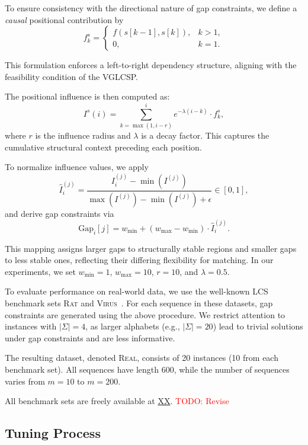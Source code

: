 \documentclass[runningheads]{llncs}
\begin{document}
To ensure consistency with the directional nature of gap constraints, we define a \emph{causal} positional contribution by
\[
f^s_k =
\begin{cases}
	f(s[k-1], s[k]), & k > 1, \\
	0, & k = 1.
\end{cases}
\]

This formulation enforces a left-to-right dependency structure, aligning with the feasibility condition of the VGLCSP.

The positional influence is then computed as:
\[
I^s(i) = \sum_{k=\max(1,i-r)}^{i} e^{-\lambda (i-k)} \cdot f^s_k,
\]
where $r$ is the influence radius and $\lambda$ is a decay factor. This captures the cumulative structural context preceding each position.

To normalize influence values, we apply
\[
\hat{I}^{(j)}_i = \frac{I^{(j)}_i - \min(I^{(j)})}{\max(I^{(j)}) - \min(I^{(j)}) + \epsilon} \in [0,1],
\]
and derive gap constraints via
\[
\text{Gap}_i[j] = w_{\min} + (w_{\max} - w_{\min}) \cdot \hat{I}^{(j)}_i.
\]

This mapping assigns larger gaps to structurally stable regions and smaller gaps to less stable ones, reflecting their differing flexibility for matching. In our experiments, we set $w_{\min}=1$, $w_{\max}=10$, $r=10$, and $\lambda=0.5$.


\medskip
\noindent
To evaluate performance on real-world data, we use the well-known LCS benchmark sets \textsc{Rat} and \textsc{Virus}~\cite{DJUKANOVIC2020106499}. For each sequence in these datasets, gap constraints are generated using the above procedure. We restrict attention to instances with $|\Sigma|=4$, as larger alphabets (e.g., $|\Sigma|=20$) lead to trivial solutions under gap constraints and are less informative.

The resulting dataset, denoted \textsc{Real}, consists of 20 instances (10 from each benchmark set). All sequences have length 600, while the number of sequences varies from $m=10$ to $m=200$.


 All benchmark sets are freely available at   
\url{XX}. \textcolor{red}{TODO: Revise } \\
 
\subsection{Tuning Process}
\end{document}
